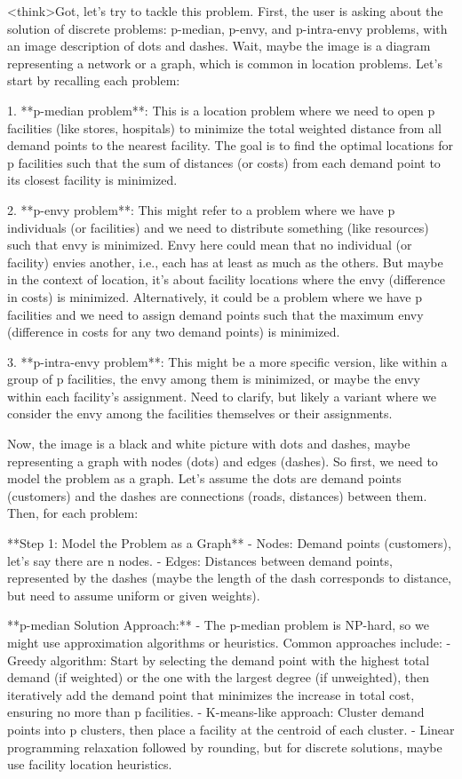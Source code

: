 <think>Got, let's try to tackle this problem. First, the user is asking about the solution of discrete problems: p-median, p-envy, and p-intra-envy problems, with an image description of dots and dashes. Wait, maybe the image is a diagram representing a network or a graph, which is common in location problems. Let's start by recalling each problem:

1. **p-median problem**: This is a location problem where we need to open p facilities (like stores, hospitals) to minimize the total weighted distance from all demand points to the nearest facility. The goal is to find the optimal locations for p facilities such that the sum of distances (or costs) from each demand point to its closest facility is minimized.

2. **p-envy problem**: This might refer to a problem where we have p individuals (or facilities) and we need to distribute something (like resources) such that envy is minimized. Envy here could mean that no individual (or facility) envies another, i.e., each has at least as much as the others. But maybe in the context of location, it's about facility locations where the envy (difference in costs) is minimized. Alternatively, it could be a problem where we have p facilities and we need to assign demand points such that the maximum envy (difference in costs for any two demand points) is minimized.

3. **p-intra-envy problem**: This might be a more specific version, like within a group of p facilities, the envy among them is minimized, or maybe the envy within each facility's assignment. Need to clarify, but likely a variant where we consider the envy among the facilities themselves or their assignments.

Now, the image is a black and white picture with dots and dashes, maybe representing a graph with nodes (dots) and edges (dashes). So first, we need to model the problem as a graph. Let's assume the dots are demand points (customers) and the dashes are connections (roads, distances) between them. Then, for each problem:

**Step 1: Model the Problem as a Graph**
- Nodes: Demand points (customers), let's say there are n nodes.
- Edges: Distances between demand points, represented by the dashes (maybe the length of the dash corresponds to distance, but need to assume uniform or given weights).

**p-median Solution Approach:**
- The p-median problem is NP-hard, so we might use approximation algorithms or heuristics. Common approaches include:
  - Greedy algorithm: Start by selecting the demand point with the highest total demand (if weighted) or the one with the largest degree (if unweighted), then iteratively add the demand point that minimizes the increase in total cost, ensuring no more than p facilities.
  - K-means-like approach: Cluster demand points into p clusters, then place a facility at the centroid of each cluster.
  - Linear programming relaxation followed by rounding, but for discrete solutions, maybe use facility location heuristics.

